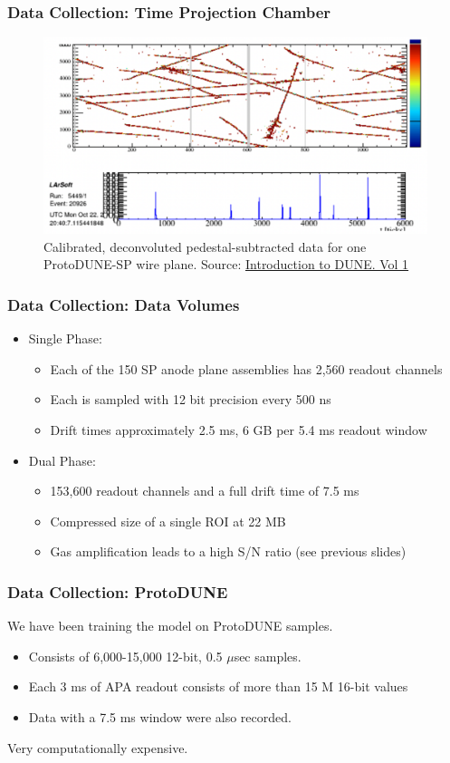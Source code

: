 \documentclass{beamer}
\begin{document}
\begin{frame}
	\frametitle{Data Collection: Time Projection Chamber}
	\begin{figure}[h!]
		\includegraphics[width=.8\textwidth]{images/data2.png}
		\caption{Calibrated, deconvoluted pedestal-subtracted data for one ProtoDUNE-SP wire plane. Source: \href{https://arxiv.org/abs/2002.02967}{\color{blue} Introduction to DUNE. Vol 1}}
		\label{far_detector}
	\end{figure}
\end{frame}

\begin{frame}
	\frametitle{Data Collection: Data Volumes}
	\begin{itemize}
		\item Single Phase:
		\begin{itemize}
			\item Each of the 150 SP anode plane assemblies has 2,560 readout channels
			\item Each is sampled with 12 bit precision every 500 ns
			\item Drift times approximately 2.5 ms, 6 GB per 5.4 ms readout window
		\end{itemize}

		\item Dual Phase:
		\begin{itemize}
			\item 153,600 readout channels and a full drift time of 7.5 ms
			\item Compressed size of a single ROI at 22 MB
			\item Gas amplification leads to a high S/N ratio (see previous slides)
		\end{itemize}
	\end{itemize}
\end{frame}


\begin{frame}
	\frametitle{Data Collection: ProtoDUNE}
	We have been training the model on ProtoDUNE samples.
	\begin{itemize}
		\item Consists of 6,000-15,000 12-bit, 0.5 $\mu$sec samples.
		\item Each 3 ms of APA readout consists of more than 15 M 16-bit values
		\item Data with a 7.5 ms window were also recorded.
	\end{itemize}
	Very computationally expensive.
\end{frame}
\end{document}
